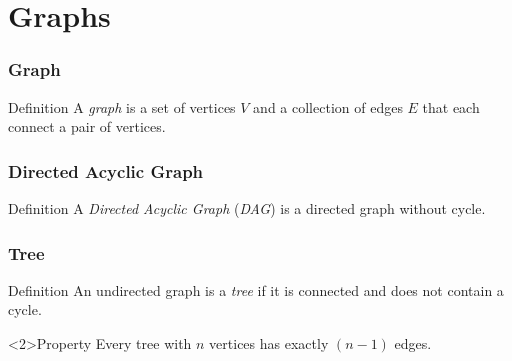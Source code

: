 \documentclass{beamer}
\begin{document}
\section{Graphs}

\hypertarget{slide:graphs}{}

\begin{frame}%
\frametitle{Graph}

\begin{block}{Definition}
A \emph{graph} is a set of vertices $V$ and a collection of edges $E$ that each connect a
pair of vertices.
\end{block}

\end{frame}

\begin{frame}%
\frametitle{Directed Acyclic Graph}

\begin{block}{Definition}
A \emph{Directed Acyclic Graph} (\emph{DAG}) is a directed graph without cycle.
\end{block}


\end{frame}

\begin{frame}%
\frametitle{Tree}
\scriptsize
\begin{block}{Definition}
An undirected graph is a \emph{tree} if it is connected and does not contain a cycle.
\end{block}


\begin{block}<2>{Property}
Every tree with $n$ vertices has exactly $(n - 1)$ edges.
\end{block}

\end{frame}
\end{document}
